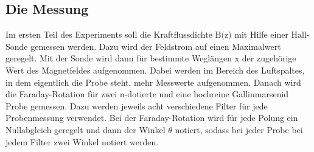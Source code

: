 \subsection{Die Messung}
Im ersten Teil des Experiments soll die Kraftflussdichte $\text{B(z)}$ mit
Hilfe einer Hall-Sonde gemessen werden. Dazu wird der Feldstrom auf einen
Maximalwert geregelt. Mit der Sonde wird dann für bestimmte Weglängen $\text{x}$
der zugehörige Wert des Magnetfeldes aufgenommen. Dabei werden im Bereich des
Luftspaltes, in dem eigentlich die Probe steht, mehr Messwerte aufgenommen.
Danach wird die Faraday-Rotation für zwei n-dotierte und eine hochreine
Galliumarsenid Probe gemessen. Dazu werden jeweils acht verschiedene Filter
für jede Probenmessung verwendet. Bei der Faraday-Rotation wird für jede
Polung ein Nullabgleich geregelt und dann der Winkel $\theta$ notiert, sodass
bei jeder Probe bei jedem Filter zwei Winkel notiert werden.
